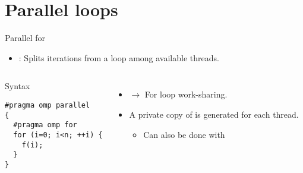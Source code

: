 \section{Parallel loops}

\begin{frame}[t,fragile]{Parallel for}
\begin{itemize}
  \item {}: 
        Splits iterations from a loop among available threads.
\end{itemize}

\begin{columns}[T]

\begin{block}{Syntax}
\begin{lstlisting}
#pragma omp parallel
{
  #pragma omp for
  for (i=0; i<n; ++i) {
    f(i);
  }
}
\end{lstlisting}
\end{block}

\begin{itemize}
  \item {} $\rightarrow$ For loop work-sharing.
  \item A private copy of  is generated for each thread.
    \begin{itemize}
      \item Can also be done with \cppkey{)}
    \end{itemize}
\end{itemize}

\end{columns}

\end{frame}

